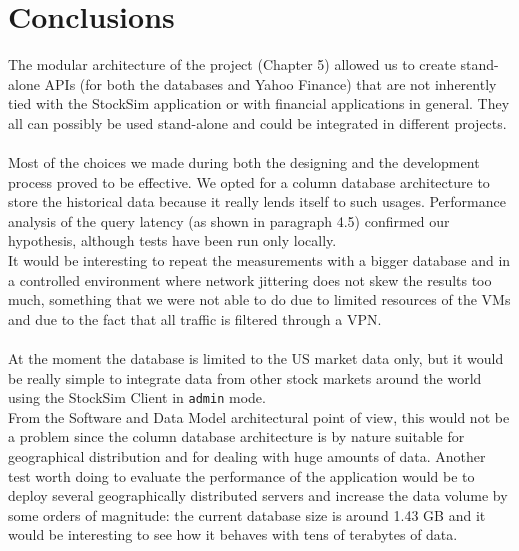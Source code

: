 \chapter{Conclusions}
The modular architecture of the project (Chapter 5) allowed us to create
stand-alone APIs (for both the databases and Yahoo Finance) that are not
inherently tied with the StockSim application or with financial applications in
general. They all can possibly be used stand-alone and could be integrated in
different projects.\\
\\
Most of the choices we made during both the designing and the development
process proved to be effective. We opted for a column database architecture to
store the historical data because it really lends itself to such usages.
Performance analysis of the query latency (as shown in paragraph 4.5) confirmed
our hypothesis, although tests have been run only locally.\\
It would be interesting to repeat the measurements with a bigger database and in
a controlled environment where network jittering does not skew the results too
much, something that we were not able to do due to limited resources of the VMs
and due to the fact that all traffic is filtered through a VPN.\\
\\
At the moment the database is limited to the US market data only, but it would
be really simple to integrate data from other stock markets around the world
using the StockSim Client in \texttt{admin} mode.\\
From the Software and Data Model architectural point of view, this would not be
a problem since the column database architecture is by nature suitable for
geographical distribution and for dealing with huge amounts of data. Another
test worth doing to evaluate the performance of the application would be to
deploy several geographically distributed servers and increase the data volume
by some orders of magnitude: the current database size is around 1.43 GB and it
would be interesting to see how it behaves with tens of terabytes of data.
